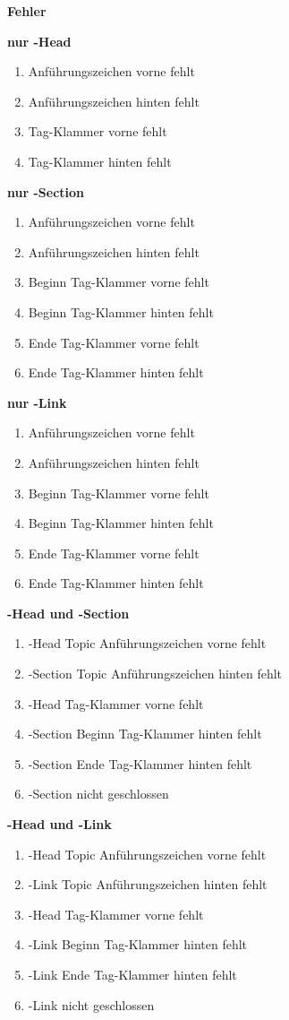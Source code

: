 \textbf{{\large Fehler}}

\textbf{nur \SEARCH-Head}
\begin{enumerate}
\item Anführungszeichen vorne fehlt
\item Anführungszeichen hinten fehlt
\item Tag-Klammer vorne fehlt
\item Tag-Klammer hinten fehlt
\end{enumerate}

\textbf{nur \SEARCH-Section}
\begin{enumerate}
\item Anführungszeichen vorne fehlt
\item Anführungszeichen hinten fehlt
\item Beginn Tag-Klammer vorne fehlt
\item Beginn Tag-Klammer hinten fehlt
\item Ende Tag-Klammer vorne fehlt
\item Ende Tag-Klammer hinten fehlt
\end{enumerate}

\textbf{nur \SEARCH-Link}
\begin{enumerate}
\item Anführungszeichen vorne fehlt
\item Anführungszeichen hinten fehlt
\item Beginn Tag-Klammer vorne fehlt
\item Beginn Tag-Klammer hinten fehlt
\item Ende Tag-Klammer vorne fehlt
\item Ende Tag-Klammer hinten fehlt
\end{enumerate}

\textbf{\SEARCH-Head und \SEARCH-Section} 
\begin{enumerate}
\item \SEARCH-Head Topic Anführungszeichen vorne fehlt
\item \SEARCH-Section Topic Anführungszeichen hinten fehlt
\item \SEARCH-Head Tag-Klammer vorne fehlt
\item \SEARCH-Section Beginn Tag-Klammer hinten fehlt
\item \SEARCH-Section Ende Tag-Klammer hinten fehlt
\item \SEARCH-Section nicht geschlossen
\end{enumerate}

\pagebreak
\textbf{\SEARCH-Head und \SEARCH-Link} 
\begin{enumerate}
\item \SEARCH-Head Topic Anführungszeichen vorne fehlt
\item \SEARCH-Link Topic Anführungszeichen hinten fehlt
\item \SEARCH-Head Tag-Klammer vorne fehlt
\item \SEARCH-Link Beginn Tag-Klammer hinten fehlt
\item \SEARCH-Link Ende Tag-Klammer hinten fehlt
\item \SEARCH-Link nicht geschlossen
\end{enumerate}

